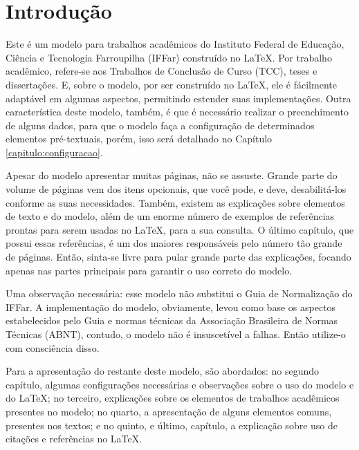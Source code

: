 \chapter{Introdução}
Este é um modelo para trabalhos acadêmicos do Instituto Federal de Educação, Ciência e Tecnologia Farroupilha (IFFar) construído no \LaTeX{}. Por trabalho acadêmico, refere-se aos Trabalhos de Conclusão de Curso (TCC), teses e dissertações. E, sobre o modelo, por ser construído no \LaTeX{}, ele é fácilmente adaptável em algumas aspectos, permitindo estender suas implementações. Outra característica deste modelo, também, é que é necessário realizar o preenchimento de alguns dados, para que o modelo faça a configuração de determinados elementos pré-textuais, porém, isso será detalhado no Capítulo \ref{capitulo:configuracao}.

Apesar do modelo apresentar muitas páginas, não se assuste. Grande parte do volume de páginas vem dos itens opcionais, que você pode, e deve, desabilitá-los conforme as suas necessidades. Também, existem as explicações sobre elementos de texto e do modelo, além de um enorme número de exemplos de referências prontas para serem usadas no \LaTeX{}, para a sua consulta. O último capítulo, que possui essas referências, é um dos maiores responsáveis pelo número tão grande de páginas. Então, sinta-se livre para pular grande parte das explicações, focando apenas nas partes principais para garantir o uso correto do modelo.

Uma observação necessária: esse modelo não substitui o Guia de Normalização do IFFar. A implementação do modelo, obviamente, levou como base os aspectos estabelecidos pelo Guia e normas técnicas da Associação Brasileira de Normas Técnicas (ABNT), contudo, o modelo não é insuscetível a falhas. Então utilize-o com consciência disso.

Para a apresentação do restante deste modelo, são abordados: no segundo capítulo, algumas configurações necessárias e observações sobre o uso do modelo e do \LaTeX{}; no terceiro, explicações sobre os elementos de trabalhos acadêmicos presentes no modelo; no quarto, a apresentação de alguns elementos comuns, presentes nos textos; e no quinto, e último, capítulo, a explicação sobre uso de citações e referências no \LaTeX{}.
